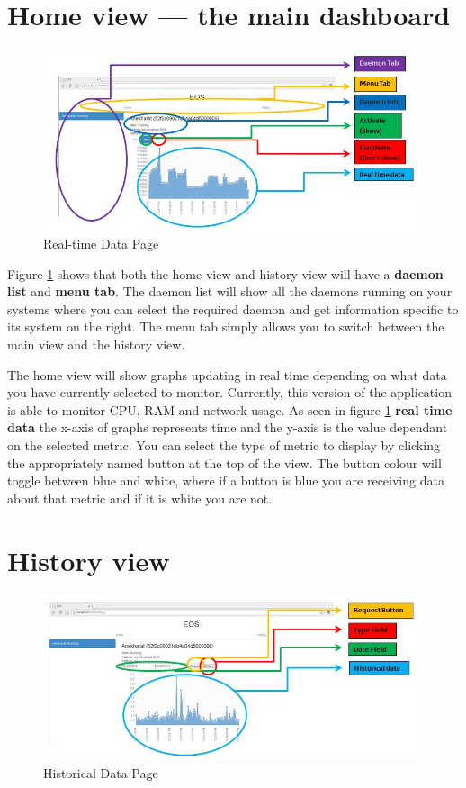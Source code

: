 \documentclass{l3proj}
\begin{document}
\begin{appendices}
\section{Home view --- the main dashboard}

\begin{figure}[H]
\centering
\includegraphics[width=110mm]{Manual_Images/realtime_data.JPG}
\caption{Real-time Data Page}
\label{fig:Real-time Data Page}
\end{figure}

Figure \ref{fig:Real-time Data Page} shows that both the home view and history view will have a \textbf{daemon list} and \textbf{menu tab}. The daemon list will show all the daemons running on your systems where you can select the required daemon and get information specific to its system on the right. The menu tab simply allows you to switch between the main view and the history view.

The home view will show graphs updating in real time depending on what data you have currently selected to monitor. Currently, this version of the application is able to monitor CPU, RAM and network usage. As seen in figure \ref{fig:Real-time Data Page} \textbf{real time data} the x-axis of graphs represents time and the y-axis is the value dependant on the selected metric. You can select the type of metric to display by clicking the appropriately named button at the top of the view. The button colour will toggle between blue and white, where if a button is blue you are receiving data about that metric and if it is white you are not.

\section{History view}

\begin{figure}[H]
\centering
\includegraphics[width=110mm]{Manual_Images/historical_data.JPG}
\caption{Historical Data Page}
\label{fig:Historical Data Page}
\end{figure}


\end{appendices}
\end{document}
